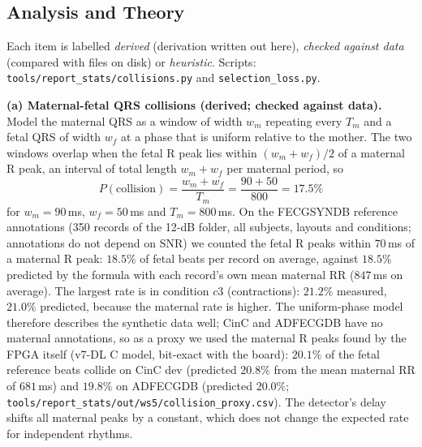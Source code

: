 \begin{finalpart}
\subsection{Analysis and Theory}
\label{sec:analysis}
Each item is labelled \emph{derived} (derivation written out here), \emph{checked against data} (compared with files on disk) or \emph{heuristic}. Scripts: \texttt{tools/report\_stats/collisions.py} and \texttt{selection\_loss.py}.

\noindent\textbf{(a) Maternal-fetal QRS collisions (derived; checked against data).} Model the maternal QRS as a window of width $w_m$ repeating every $T_m$ and a fetal QRS of width $w_f$ at a phase that is uniform relative to the mother. The two windows overlap when the fetal R peak lies within $(w_m + w_f)/2$ of a maternal R peak, an interval of total length $w_m + w_f$ per maternal period, so
\begin{equation}
P(\text{collision}) = \frac{w_m + w_f}{T_m} = \frac{90 + 50}{800} = 17.5\%
\end{equation}
for $w_m = 90\,$ms, $w_f = 50\,$ms and $T_m = 800\,$ms. On the FECGSYNDB reference annotations (350 records of the 12-dB folder, all subjects, layouts and conditions; annotations do not depend on SNR) we counted the fetal R peaks within $70\,$ms of a maternal R peak: $18.5\%$ of fetal beats per record on average, against $18.5\%$ predicted by the formula with each record's own mean maternal RR ($847\,$ms on average). %
The largest rate is in condition $c3$ (contractions): $21.2\%$ measured, $21.0\%$ predicted, because the maternal rate is higher. %
The uniform-phase model therefore describes the synthetic data well; CinC and ADFECGDB have no maternal annotations, so as a proxy we used the maternal R peaks found by the FPGA itself (v7-DL C model, bit-exact with the board): $20.1\%$ of the fetal reference beats collide on CinC dev (predicted $20.8\%$ from the mean maternal RR of $681\,$ms) and $19.8\%$ on ADFECGDB (predicted $20.0\%$; \texttt{tools/report\_stats/out/ws5/collision\_proxy.csv}). The detector's delay shifts all maternal peaks by a constant, which does not change the expected rate for independent rhythms.


\end{finalpart}
